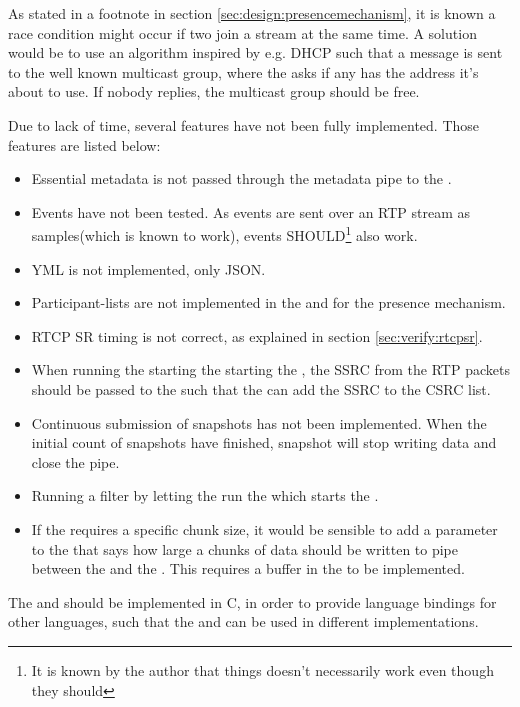 \noindent{}As stated in a footnote in section \ref{sec:design:presencemechanism}, it is known a race condition might occur if two \pubs{} join a stream at the same time. A solution would be to use an algorithm inspired by e.g. \ac{DHCP} such that a message is sent to the well known multicast group, where the \pub{} asks if any has the address it's about to use. If nobody replies, the multicast group should be free.


\noindent{}Due to lack of time, several features have not been fully implemented.
Those features are listed below:
\begin{itemize}
	\item Essential metadata is not passed through the metadata pipe to the \con{}.
	\item Events have not been tested. As events are sent over an RTP stream as samples(which is known to work), events SHOULD\footnote{It is known by the author that things doesn't necessarily work even though they should} also work.
	\item YML is not implemented, only JSON.
	\item Participant-lists are not implemented in the \sub{} and \pub{} for the presence mechanism.
	\item RTCP SR timing is not correct, as explained in section \ref{sec:verify:rtcpsr}.
	\item When running the \sub{} starting the \pub{} starting the , the SSRC from the RTP packets should be passed to the \pub{} such that the \pub{} can add the SSRC to the CSRC list. 
	\item Continuous submission of snapshots has not been implemented. When the initial count of snapshots have finished, snapshot will stop writing data and close the pipe.
	\item Running a filter by letting the \sub{} run the \pub{} which starts the .
	\item If the  requires a specific chunk size, it would be sensible to add a parameter to the \sub{} that says how large a chunks of data should be written to pipe between the \sub{} and the . This requires a buffer in the \sub{} to be implemented.
\end{itemize}

The \pub{} and \sub{} should be implemented in C, in order to provide language bindings for other languages, such that the \pub{} and \sub{} can be used in different implementations.



